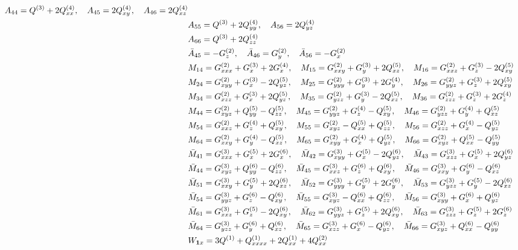 \documentclass[11pt]{easymemo}
\begin{document}
\begin{align}
A_{44}=Q^{(3)} + 2Q^{(4)}_{xx},
\quad
A_{45}=2Q^{(4)}_{xy},
\quad
A_{46}=2Q^{(4)}_{xz}
\cr&
A_{55}=Q^{(3)} + 2Q^{(4)}_{yy},
\quad
A_{56}=2Q^{(4)}_{yz}
\cr&
A_{66}=Q^{(3)} + 2Q^{(4)}_{zz}
\\&
\bar{A}_{45}=-G^{(2)}_{z},
\quad
\bar{A}_{46}=G^{(2)}_{y},
\quad
\bar{A}_{56}=-G^{(2)}_{x}
\\&
M_{14}=G^{(2)}_{xxx} + G^{(3)}_{x} + 2G^{(4)}_{x},
\quad
M_{15}=G^{(2)}_{xxy} + G^{(3)}_{y} + 2Q^{(5)}_{xz},
\quad
M_{16}=G^{(2)}_{xxz} + G^{(3)}_{z} - 2Q^{(5)}_{xy}
\cr&
M_{24}=G^{(2)}_{xyy} + G^{(3)}_{x} - 2Q^{(5)}_{yz},
\quad
M_{25}=G^{(2)}_{yyy} + G^{(3)}_{y} + 2G^{(4)}_{y},
\quad
M_{26}=G^{(2)}_{yyz} + G^{(3)}_{z} + 2Q^{(5)}_{xy}
\cr&
M_{34}=G^{(2)}_{xzz} + G^{(3)}_{x} + 2Q^{(5)}_{yz},
\quad
M_{35}=G^{(2)}_{yzz} + G^{(3)}_{y} - 2Q^{(5)}_{xz},
\quad
M_{36}=G^{(2)}_{zzz} + G^{(3)}_{z} + 2G^{(4)}_{z}
\cr&
M_{44}=G^{(2)}_{xyz} + Q^{(5)}_{yy} - Q^{(5)}_{zz},
\quad
M_{45}=G^{(2)}_{yyz} + G^{(4)}_{z} - Q^{(5)}_{xy},
\quad
M_{46}=G^{(2)}_{yzz} + G^{(4)}_{y} + Q^{(5)}_{xz}
\cr&
M_{54}=G^{(2)}_{xxz} + G^{(4)}_{z} + Q^{(5)}_{xy},
\quad
M_{55}=G^{(2)}_{xyz} - Q^{(5)}_{xx} + Q^{(5)}_{zz},
\quad
M_{56}=G^{(2)}_{xzz} + G^{(4)}_{x} - Q^{(5)}_{yz}
\cr&
M_{64}=G^{(2)}_{xxy} + G^{(4)}_{y} - Q^{(5)}_{xz},
\quad
M_{65}=G^{(2)}_{xyy} + G^{(4)}_{x} + Q^{(5)}_{yz},
\quad
M_{66}=G^{(2)}_{xyz} + Q^{(5)}_{xx} - Q^{(5)}_{yy}
\\&
\bar{M}_{41}=G^{(3)}_{xxx} + G^{(5)}_{x} + 2G^{(6)}_{x},
\quad
\bar{M}_{42}=G^{(3)}_{xyy} + G^{(5)}_{x} - 2Q^{(6)}_{yz},
\quad
\bar{M}_{43}=G^{(3)}_{xzz} + G^{(5)}_{x} + 2Q^{(6)}_{yz}
\cr&
\bar{M}_{44}=G^{(3)}_{xyz} + Q^{(6)}_{yy} - Q^{(6)}_{zz},
\quad
\bar{M}_{45}=G^{(3)}_{xxz} + G^{(6)}_{z} + Q^{(6)}_{xy},
\quad
\bar{M}_{46}=G^{(3)}_{xxy} + G^{(6)}_{y} - Q^{(6)}_{xz}
\cr&
\bar{M}_{51}=G^{(3)}_{xxy} + G^{(5)}_{y} + 2Q^{(6)}_{xz},
\quad
\bar{M}_{52}=G^{(3)}_{yyy} + G^{(5)}_{y} + 2G^{(6)}_{y},
\quad
\bar{M}_{53}=G^{(3)}_{yzz} + G^{(5)}_{y} - 2Q^{(6)}_{xz}
\cr&
\bar{M}_{54}=G^{(3)}_{yyz} + G^{(6)}_{z} - Q^{(6)}_{xy},
\quad
\bar{M}_{55}=G^{(3)}_{xyz} - Q^{(6)}_{xx} + Q^{(6)}_{zz},
\quad
\bar{M}_{56}=G^{(3)}_{xyy} + G^{(6)}_{x} + Q^{(6)}_{yz}
\cr&
\bar{M}_{61}=G^{(3)}_{xxz} + G^{(5)}_{z} - 2Q^{(6)}_{xy},
\quad
\bar{M}_{62}=G^{(3)}_{yyz} + G^{(5)}_{z} + 2Q^{(6)}_{xy},
\quad
\bar{M}_{63}=G^{(3)}_{zzz} + G^{(5)}_{z} + 2G^{(6)}_{z}
\cr&
\bar{M}_{64}=G^{(3)}_{yzz} + G^{(6)}_{y} + Q^{(6)}_{xz},
\quad
\bar{M}_{65}=G^{(3)}_{xzz} + G^{(6)}_{x} - Q^{(6)}_{yz},
\quad
\bar{M}_{66}=G^{(3)}_{xyz} + Q^{(6)}_{xx} - Q^{(6)}_{yy}
\\&
W_{\textbf{1}x}=3Q^{(1)} + Q^{(1)}_{xxxx} + 2Q^{(1)}_{xx} + 4Q^{(2)}_{xx}

\end{align}
\end{document}
